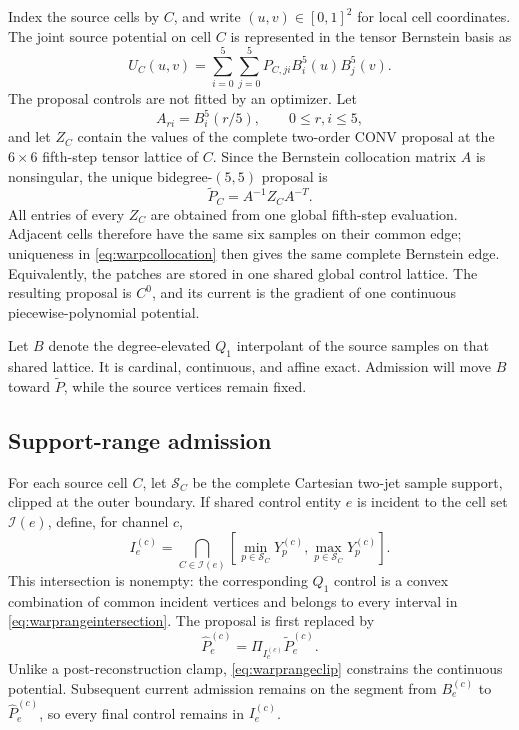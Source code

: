 \documentclass[journal]{IEEEtran}
\begin{document}
Index the source cells by \(C\), and write \((u,v)\in[0,1]^2\) for local
cell coordinates.  The joint source potential on cell \(C\) is represented
in the tensor Bernstein basis as
\begin{equation}
 U_C(u,v)=\sum_{i=0}^{5}\sum_{j=0}^{5}
 P_{C,ji}B_i^5(u)B_j^5(v).
 \label{eq:warppatch}
\end{equation}
The proposal controls are not fitted by an optimizer.  Let
\begin{equation}
 A_{ri}=B_i^5(r/5),\qquad 0\leq r,i\leq5,
 \label{eq:warpcollocation}
\end{equation}
and let \(Z_C\) contain the values of the complete two-order CONV proposal at
the \(6\times6\) fifth-step tensor lattice of \(C\).  Since the Bernstein
collocation matrix \(A\) is nonsingular, the unique bidegree-\((5,5)\)
proposal is
\begin{equation}
 \widetilde P_C=A^{-1}Z_CA^{-T}.
 \label{eq:warpproposal}
\end{equation}
All entries of every \(Z_C\) are obtained from one global fifth-step
evaluation.  Adjacent cells therefore have the same six samples on their
common edge; uniqueness in \eqref{eq:warpcollocation} then gives the same
complete Bernstein edge.  Equivalently, the patches are stored in one shared
global control lattice.  The resulting proposal is \(C^0\), and its current
is the gradient of one continuous piecewise-polynomial potential.

Let \(B\) denote the degree-elevated \(Q_1\) interpolant of the source
samples on that shared lattice.  It is cardinal, continuous, and affine
exact.  Admission will move \(B\) toward \(\widetilde P\), while the source
vertices remain fixed.

\subsection{Support-range admission}

For each source cell \(C\), let \(\mathcal S_C\) be the complete Cartesian
two-jet sample support, clipped at the outer boundary.  If shared control
entity \(e\) is incident to the cell set \(\mathcal I(e)\), define, for
channel \(c\),
\begin{equation}
 I_e^{(c)}=
 \bigcap_{C\in\mathcal I(e)}
 \left[
  \min_{p\in\mathcal S_C}Y_p^{(c)},
  \max_{p\in\mathcal S_C}Y_p^{(c)}
 \right].
 \label{eq:warprangeintersection}
\end{equation}
This intersection is nonempty: the corresponding \(Q_1\) control is a
convex combination of common incident vertices and belongs to every interval
in \eqref{eq:warprangeintersection}.  The proposal is first replaced by
\begin{equation}
 \widehat P_e^{(c)}=\Pi_{I_e^{(c)}}\widetilde P_e^{(c)}.
 \label{eq:warprangeclip}
\end{equation}
Unlike a post-reconstruction clamp, \eqref{eq:warprangeclip} constrains the
continuous potential.  Subsequent current admission remains on the segment
from \(B_e^{(c)}\) to \(\widehat P_e^{(c)}\), so every final control remains
in \(I_e^{(c)}\).
\end{document}
